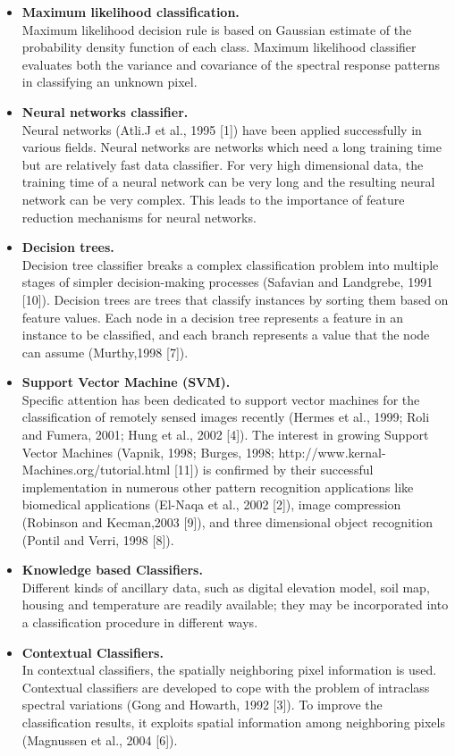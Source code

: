 \documentclass[11pt]{article}
\begin{document}
\begin{itemize}
\item {\bf Maximum likelihood classification.} \\
Maximum likelihood decision rule is based on Gaussian estimate of the probability density function of each class. Maximum likelihood classifier evaluates both the variance and covariance of the spectral response patterns in classifying an unknown pixel.
\item {\bf Neural networks classifier. } \\
Neural networks (Atli.J et al., 1995 [1]) have been applied successfully in various fields. Neural networks are networks which need a long training time but are relatively fast data classifier. For very high dimensional data, the training time of a neural network can be very long and the resulting neural network can be very complex. This leads to the importance of feature reduction mechanisms for neural networks.
\item {\bf Decision trees. }\\
Decision tree classifier breaks a complex classification problem into multiple stages of simpler decision-making processes (Safavian and Landgrebe, 1991 [10]). Decision trees are trees that classify instances by sorting them based on feature values. Each node in a decision tree represents a feature in an instance to be classified, and each branch represents a value that the node can assume (Murthy,1998 [7]).
\item {\bf Support Vector Machine (SVM).}\\
Specific attention has been dedicated to support vector machines for the classification of remotely sensed images recently (Hermes et al., 1999; Roli and Fumera, 2001; Hung et al., 2002 [4]). The interest in growing Support Vector Machines (Vapnik, 1998; Burges, 1998; http://www.kernal-Machines.org/tutorial.html [11]) is confirmed by their successful implementation in numerous other pattern recognition applications like biomedical applications (El-Naqa et al., 2002 [2]), image compression (Robinson and Kecman,2003 [9]), and three dimensional object recognition (Pontil and Verri, 1998 [8]).
\item {\bf Knowledge based Classifiers.}\\
Different kinds of ancillary data, such as digital elevation model, soil map, housing and temperature are readily available; they may be incorporated into a classification procedure in different ways.
\item {\bf Contextual Classifiers.}\\
In contextual classifiers, the spatially neighboring pixel information is used. Contextual classifiers are developed to cope with the problem of intraclass spectral variations (Gong and Howarth, 1992 [3]). To improve the classification results, it exploits spatial information among neighboring pixels (Magnussen et al., 2004 [6]).
\end{itemize}
\end{document}
